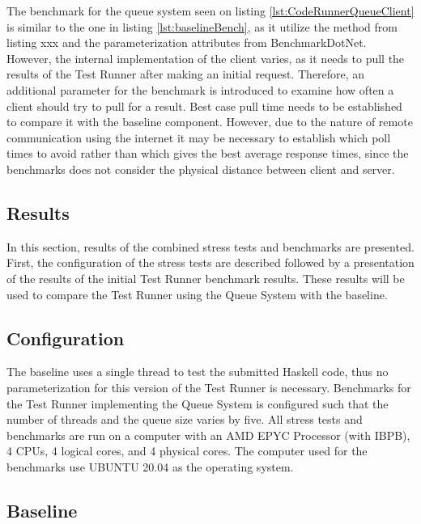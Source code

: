 The benchmark for the queue system seen on listing \ref{lst:CodeRunnerQueueClient} is similar to the one in listing \ref{lst:baselineBench}, as it utilize the method from listing xxx and the parameterization attributes from BenchmarkDotNet. However, the internal implementation of the client varies, as it needs to pull the results of the Test Runner after making an initial request. 
Therefore, an additional parameter for the benchmark is introduced to examine how often a client should try to pull for a result.
Best case pull time needs to be established to compare it with the baseline component. 
However, due to the nature of remote communication using the internet it may be necessary to establish which poll times to avoid rather than which gives the best average response times, since the benchmarks does not consider the physical distance between client and server.

\subsection{Results}
In this section, results of the combined stress tests and benchmarks are presented.
First, the configuration of the stress tests are described followed by a presentation of the results of the initial Test Runner benchmark results. These results will be used to compare the Test Runner using the Queue System with the baseline.  

\subsection{Configuration}
The baseline uses a single thread to test the submitted Haskell code, thus no parameterization for this version of the Test Runner is necessary.
Benchmarks for the Test Runner implementing the Queue System is configured such that the number of threads and the queue size varies by five. 
All stress tests and benchmarks are run on a computer with an AMD EPYC Processor (with IBPB), 4 CPUs, 4 logical cores, and 4 physical cores. The computer used for the benchmarks use UBUNTU 20.04 as the operating system.

\subsection{Baseline}


